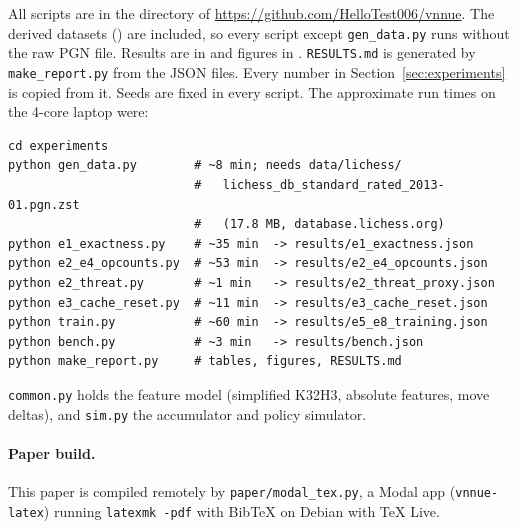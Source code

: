 All scripts are in the directory  of \url{https://github.com/HelloTest006/vnnue}.
The derived datasets () are included, so every script except \texttt{gen\_data.py} runs without the raw PGN file.
Results are in  and figures in .
\texttt{RESULTS.md} is generated by \texttt{make\_report.py} from the JSON files.
Every number in Section~\ref{sec:experiments} is copied from it.
Seeds are fixed in every script.
The approximate run times on the 4-core laptop were:
\begin{verbatim}
cd experiments
python gen_data.py        # ~8 min; needs data/lichess/
                          #   lichess_db_standard_rated_2013-01.pgn.zst
                          #   (17.8 MB, database.lichess.org)
python e1_exactness.py    # ~35 min  -> results/e1_exactness.json
python e2_e4_opcounts.py  # ~53 min  -> results/e2_e4_opcounts.json
python e2_threat.py       # ~1 min   -> results/e2_threat_proxy.json
python e3_cache_reset.py  # ~11 min  -> results/e3_cache_reset.json
python train.py           # ~60 min  -> results/e5_e8_training.json
python bench.py           # ~3 min   -> results/bench.json
python make_report.py     # tables, figures, RESULTS.md
\end{verbatim}
\texttt{common.py} holds the feature model (simplified K32H3, absolute features, move deltas), and \texttt{sim.py} the accumulator and policy simulator.

\paragraph{Paper build.}
This paper is compiled remotely by \texttt{paper/modal\_tex.py}, a Modal app (\texttt{vnnue-latex}) running \texttt{latexmk -pdf} with BibTeX on Debian with TeX Live.
